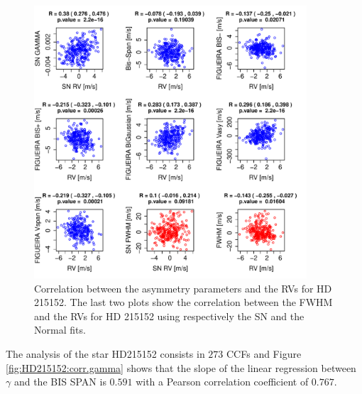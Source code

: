 \documentclass[11pt, oneside]{article}
\begin{document}
%
\begin{figure}[htbp]
   \centering
\includegraphics[height = 4in]{HD21515_[4]Comparison_para.pdf}  
   \caption{Correlation between the asymmetry parameters and the RVs for HD 215152. The last two plots show the correlation between the FWHM and the RVs for HD 215152 using respectively the SN and the Normal fits.}
   \label{fig:HD215152:corrPlot}
\end{figure}

\iffalse
The analysis of the star HD215152 consists in $273$ CCFs and Figure \ref{fig:HD215152:corr.gamma} shows that the slope of the linear regression between $\gamma$ and the BIS SPAN is $0.591$ with a Pearson correlation coefficient of $0.767$.
\end{document}
